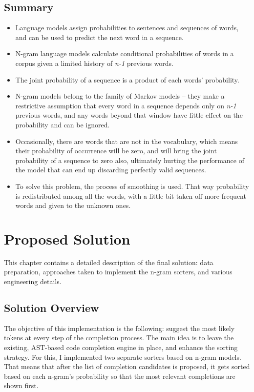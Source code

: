 \documentclass[sigplan,screen]{acmart}
\begin{document}
\subsection{Summary}
\begin{itemize}
    \item Language models assign probabilities to sentences and sequences of words, and can be used to predict the next word in a sequence.
    \item N-gram language models calculate conditional probabilities of words in a corpus given a limited history of \textit{n-1} previous words.
    \item The joint probability of a sequence is a product of each words' probability.
    \item N-gram models belong to the family of Markov models -- they make a restrictive assumption that every word in a sequence depends only on \textit{n-1} previous words, and any words beyond that window have little effect on the probability and can be ignored.
    \item Occasionally, there are words that are not in the vocabulary, which means their probability of occurrence will be zero, and will bring the joint probability of a sequence to zero also, ultimately hurting the performance of the model that can end up discarding perfectly valid sequences.
    \item To solve this problem, the process of smoothing is used. That way probability is redistributed among all the words, with a little bit taken off more frequent words and given to the unknown ones.
\end{itemize}

\section{Proposed Solution}
This chapter contains a detailed description of the final solution: data preparation, approaches taken to implement the n-gram sorters, and various engineering details.

\subsection{Solution Overview}
The objective of this implementation is the following: suggest the most likely tokens at every step of the completion process. The main idea is to leave the existing, AST-based code completion engine in place, and enhance the sorting strategy. For this, I implemented two separate sorters based on n-gram models. That means that after the list of completion candidates is proposed, it gets sorted based on each n-gram's probability so that the most relevant completions are shown first.
\end{document}
